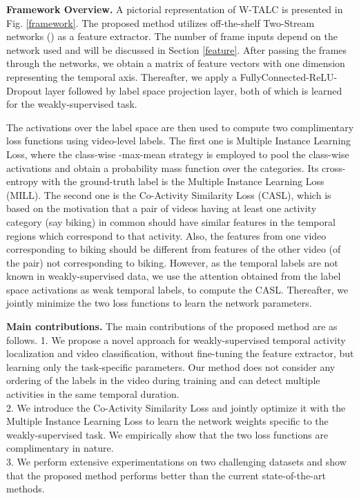 \documentclass[runningheads]{llncs}
\begin{document}
\textbf{Framework Overview.}
A pictorial representation of W-TALC is presented in Fig. \ref{framework}. The proposed method utilizes off-the-shelf Two-Stream networks (\cite{wang2017untrimmednets,carreira2017quo}) as a feature extractor. The number of frame inputs depend on the network used and will be discussed in Section \ref{feature}. After passing the frames through the networks, we obtain a matrix of feature vectors with one dimension representing the temporal axis. Thereafter, we apply a FullyConnected-ReLU-Dropout layer followed by label space projection layer, both of which is learned for the weakly-supervised task. 

The activations over the label space are then used to compute two complimentary loss functions using video-level labels. The first one is Multiple Instance Learning Loss, where the class-wise -max-mean strategy is employed to pool the class-wise activations and obtain a probability mass function over the categories. Its cross-entropy with the ground-truth label is the Multiple Instance Learning Loss (MILL). The second one is the Co-Activity Similarity Loss (CASL), which is based on the motivation that a pair of videos having at least one activity category (say biking) in common should have similar features in the temporal regions which correspond to that activity. Also, the features from one video corresponding to biking should be different from features of the other video (of the pair) not corresponding to biking. However, as the temporal labels are not known in weakly-supervised data, we use the attention obtained from the label space activations as weak temporal labels, to compute the CASL. Thereafter, we jointly minimize the two loss functions to learn the network parameters. 

\textbf{Main contributions.} The main contributions of the proposed method are as follows. 1. We propose a novel approach for weakly-supervised temporal activity localization and video classification, without fine-tuning the feature extractor, but learning only the task-specific parameters. Our method does not consider any ordering of the labels in the video during training and can detect multiple activities in the same temporal duration.\\
2. We introduce the Co-Activity Similarity Loss and jointly optimize it with the Multiple Instance Learning Loss to learn the network weights specific to the weakly-supervised task. We empirically show that the two loss functions are complimentary in nature. \\
3. We perform extensive experimentations on two challenging datasets and show that the proposed method performs better than the current state-of-the-art methods. 
\end{document}
